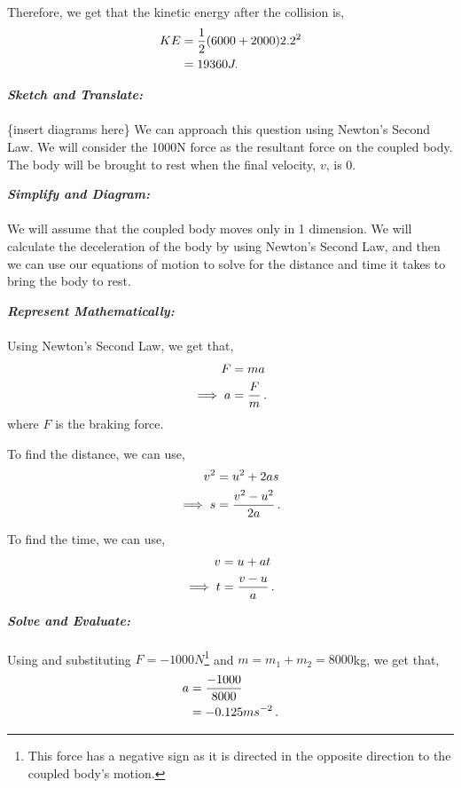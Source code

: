 \begin{subquestions}
\begin{subsubquestions}
Therefore, we get that the kinetic energy after the collision is,
\begin{align}
	KE & = \frac{1}{2}(6000+2000)2.2^2 \nonumber \\
	   & = 19360J.
\end{align} 


\subsubquestion

\textbf{\textit{Sketch and Translate:}} \\ \\
\{insert diagrams here\}
We can approach this question using Newton's Second Law. We will consider the 1000N force as the resultant force on the coupled body. The body will be brought to rest when the final velocity, $v$, is 0.




\textbf{\textit{Simplify and Diagram:}} \\ \\
We will assume that the coupled body moves only in 1 dimension. We will calculate the deceleration of the body by using Newton's Second Law, and then we can use our equations of motion to solve for the distance and time it takes to bring the body to rest.




\textbf{\textit{Represent Mathematically:}} \\ \\
Using Newton's Second Law, we get that,
\begin{align}
	F & = ma \nonumber \\
	\implies a & = \frac{F}{m} \label{2008J:q5:AEqn1} \,.
\end{align}
where $F$ is the braking force.

To find the distance, we can use,
\begin{align}
	v^2 & = u^2 + 2as \nonumber \\
	\implies s & = \frac{v^2-u^2}{2a} \label{2008J:q5:SEqn1} \,.
\end{align}

To find the time, we can use,
\begin{align}
	v & = u+at \nonumber \\
	\implies t & = \frac{v-u}{a} \label{2008J:q5:TEqn1} \,.
\end{align}




\textbf{\textit{Solve and Evaluate:}} \\ \\
Using  and substituting $F=-1000N$\footnote{This force has a negative sign as it is directed in the opposite direction to the coupled body's motion.} and $m=m_1+m_2=8000$kg, we get that,
\begin{align}
	a & = \frac{-1000}{8000} \nonumber \\
	  & = -0.125ms^{-2} \,. 
\end{align}


\end{subsubquestions}
\end{subquestions}

